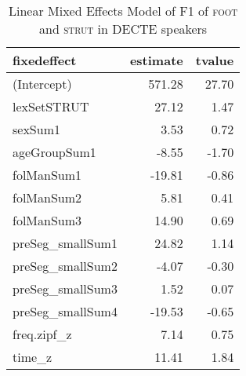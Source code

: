 \begin{table}[ht]
\centering
\begin{tabular}{lrr}
  \hline
fixedeffect & estimate & tvalue \\ 
  \hline
(Intercept) & 571.28 & 27.70 \\ 
  lexSetSTRUT & 27.12 & 1.47 \\ 
  sexSum1 & 3.53 & 0.72 \\ 
  ageGroupSum1 & -8.55 & -1.70 \\ 
  folManSum1 & -19.81 & -0.86 \\ 
  folManSum2 & 5.81 & 0.41 \\ 
  folManSum3 & 14.90 & 0.69 \\ 
  preSeg\_smallSum1 & 24.82 & 1.14 \\ 
  preSeg\_smallSum2 & -4.07 & -0.30 \\ 
  preSeg\_smallSum3 & 1.52 & 0.07 \\ 
  preSeg\_smallSum4 & -19.53 & -0.65 \\ 
  freq.zipf\_z & 7.14 & 0.75 \\ 
  time\_z & 11.41 & 1.84 \\ 
   \hline
\end{tabular}
\caption{Linear Mixed Effects Model of F1 of \textsc{foot} and \textsc{strut} in DECTE speakers \label{tbl:FSF1DE}} 
\end{table}

